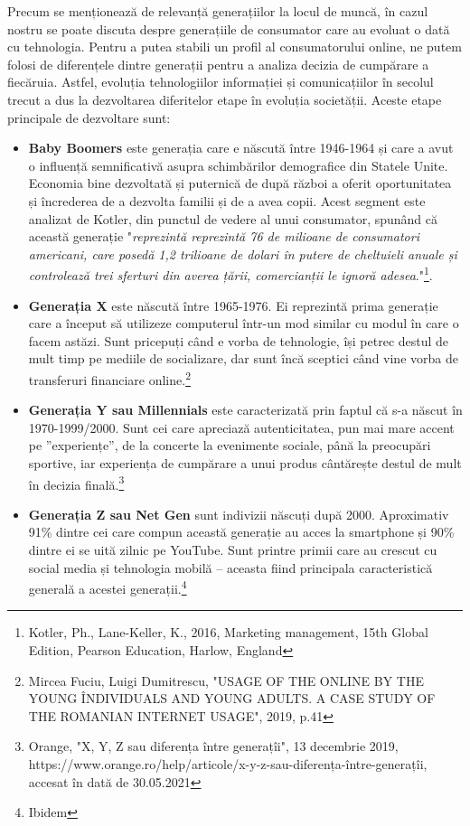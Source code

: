 \documentclass[a4paper, 12pt]{article}
\begin{document}
		\quad Precum se menționează de relevanță generațiilor la locul de muncă, în cazul nostru se poate discuta despre generațiile de consumator care au evoluat o dată cu tehnologia. Pentru a putea stabili un profil al consumatorului online, ne putem folosi de diferențele dintre generații pentru a analiza decizia de cumpărare a fiecăruia. Astfel, evoluția tehnologiilor informației și comunicațiilor în secolul trecut a dus la dezvoltarea diferitelor etape în evoluția societății. Aceste etape principale de dezvoltare sunt:
		\begin{itemize}
		\item\textbf{Baby Boomers} este generația care e născută între 1946-1964 și care a avut o influență semnificativă asupra schimbărilor demografice din Statele Unite. Economia bine dezvoltată și puternică de după război a oferit oportunitatea și încrederea de a dezvolta familii și de a avea copii. Acest segment este analizat de Kotler, din punctul de vedere al unui consumator, spunând că această generație "\textit{reprezintă reprezintă 76 de milioane de consumatori americani, care posedă 1,2 trilioane de dolari în putere de cheltuieli anuale și controlează trei sferturi din averea țării, comercianții le ignoră adesea}."\footnote{Kotler, Ph., Lane-Keller, K., 2016, Marketing management, 15th Global Edition, Pearson Education, Harlow, England}.
		\item\textbf{Generația X} este născută între 1965-1976. Ei reprezintă prima generație care a început să utilizeze computerul într-un mod similar cu modul în care o facem astăzi. Sunt pricepuți când e vorba de tehnologie, își petrec destul de mult timp pe mediile de socializare, dar sunt încă sceptici când vine vorba de transferuri financiare online.\footnote{Mircea Fuciu, Luigi Dumitrescu, "USAGE OF THE ONLINE BY THE YOUNG ÎNDIVIDUALS AND YOUNG ADULTS. A CASE STUDY OF THE ROMANIAN INTERNET USAGE", 2019, p.41 }
		\item\textbf{Generația Y sau Millennials} este caracterizată prin faptul că s-a născut în 1970-1999/2000.  Sunt cei care apreciază autenticitatea, pun mai mare accent pe ”experiențe”, de la concerte la evenimente sociale, până la preocupări sportive, iar experiența de cumpărare a unui produs cântărește destul de mult în decizia finală.\footnote{Orange, "X, Y, Z sau diferența între generațîi", 13 decembrie 2019, https://www.orange.ro/help/articole/x-y-z-sau-diferența-între-generațîi, accesat în dată de 30.05.2021}
		\item\textbf{Generația Z sau Net Gen} sunt indivizii născuți după 2000. Aproximativ 91\% dintre cei care compun această generație au acces la smartphone și 90\% dintre ei se uită zilnic pe YouTube. Sunt printre primii care au crescut cu social media și tehnologia mobilă – aceasta fiind principala caracteristică generală a acestei generații.\footnote{Ibidem}
		\end{itemize}
\end{document}
